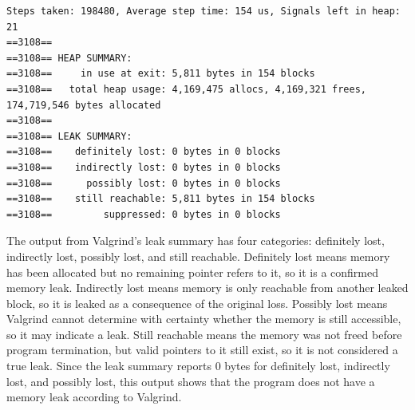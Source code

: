 \begin{verbatim}
Steps taken: 198480, Average step time: 154 us, Signals left in heap: 21
==3108== 
==3108== HEAP SUMMARY:
==3108==     in use at exit: 5,811 bytes in 154 blocks
==3108==   total heap usage: 4,169,475 allocs, 4,169,321 frees, 174,719,546 bytes allocated
==3108== 
==3108== LEAK SUMMARY:
==3108==    definitely lost: 0 bytes in 0 blocks
==3108==    indirectly lost: 0 bytes in 0 blocks
==3108==      possibly lost: 0 bytes in 0 blocks
==3108==    still reachable: 5,811 bytes in 154 blocks
==3108==         suppressed: 0 bytes in 0 blocks
\end{verbatim}

The output from Valgrind's leak summary has four categories: definitely lost, indirectly lost, possibly lost, and still reachable. Definitely lost means memory has been allocated but no remaining pointer refers to it, so it is a confirmed memory leak. Indirectly lost means memory is only reachable from another leaked block, so it is leaked as a consequence of the original loss. Possibly lost means Valgrind cannot determine with certainty whether the memory is still accessible, so it may indicate a leak. Still reachable means the memory was not freed before program termination, but valid pointers to it still exist, so it is not considered a true leak. Since the leak summary reports 0 bytes for definitely lost, indirectly lost, and possibly lost, this output shows that the program does not have a memory leak according to Valgrind.
